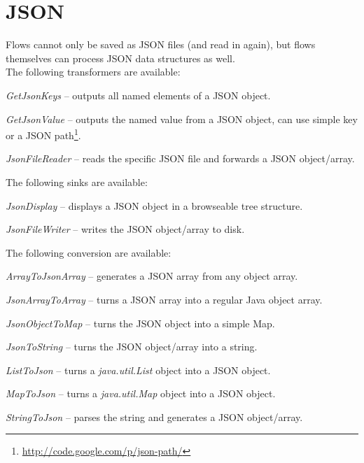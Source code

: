\section{JSON}
\label{json}
Flows cannot only be saved as JSON\cite{json} files (and read in again), but flows
themselves can process JSON data structures as well. \\
The following transformers are available:
\begin{tight_itemize}
	\item \textit{GetJsonKeys} -- outputs all named elements
	of a JSON object.
	\item \textit{GetJsonValue} -- outputs the named value 
	from a JSON object, can use simple key or a JSON 
	path\footnote{\url{http://code.google.com/p/json-path/}{}}.
	\item \textit{JsonFileReader} -- reads the specific JSON file and forwards
	a JSON object/array.
\end{tight_itemize}
The following sinks are available:
\begin{tight_itemize}
	\item \textit{JsonDisplay} -- displays a JSON object in a browseable 
	tree structure.
	\item \textit{JsonFileWriter} -- writes the JSON object/array to disk.
\end{tight_itemize}
The following conversion are available:
\begin{tight_itemize}
	\item \textit{ArrayToJsonArray} -- generates a JSON array from any object
	array.
	\item \textit{JsonArrayToArray} -- turns a JSON array into a regular Java 
	object array.
	\item \textit{JsonObjectToMap} -- turns the JSON object into a simple Map.
	\item \textit{JsonToString} -- turns the JSON object/array into a string.
	\item \textit{ListToJson} -- turns a \textit{java.util.List} object
	into a JSON object.
	\item \textit{MapToJson} -- turns a \textit{java.util.Map} object
	into a JSON object.
	\item \textit{StringToJson} -- parses the string and generates a JSON
	object/array.
\end{tight_itemize}

\newpage
